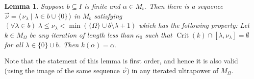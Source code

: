 \documentclass[
twoside,
]{article}
\newtheorem{lemma}[theorem]{Lemma}
\theoremstyle{definition}
\theoremstyle{remark}
\newcommand{\ords}{\Omega}
\newcommand{\sing}[1]{\{#1\}}
\newcommand{\pair}[1]{\langle#1\rangle}
\newcommand{\seq}[1]{\pair{\,#1\,}}
\DeclareMathOperator{\Crit}{Crit}
\begin{document}
   \begin{lemma}\label{thm:M_bDoesntmove_helper}
      Suppose $b\subseteq I$ is finite and $\alpha\in M_b$.   Then
      there is a sequence
      $\vec\nu=\seq{\nu_\lambda\mid \lambda\in b\cup\sing{0}}$ in
      $M_b$ satisfying 
$
        (\forall\lambda\in
        b)\;\lambda\leq\nu_\lambda<\min(\sing{\ords}\cup
        b\setminus\lambda+1)      
$
      which has the following property:  Let  $k\in
      M_\ords$ be any iteration of length less than $\kappa_0$ such
      that $\Crit(k)\cap[\lambda,\nu_\lambda]=\emptyset$ for all
      $\lambda\in\sing{0}\cup b$.  Then $k(\alpha)=\alpha$.
    \end{lemma}
    Note that the statement of this lemma is first order, and hence
    it is also valid (using the image of the same sequence $\vec\nu$)
    in any iterated ultrapower of $M_{\ords}$.
\end{document}
